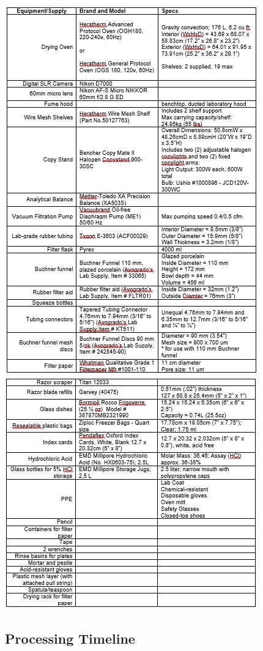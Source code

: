 \documentclass[
]{book}
\begin{document}
\includegraphics{images/CauEquipment1.jpg}
\includegraphics{images/CauEquipment2.jpg}

\hypertarget{processing-timeline}{%
\subsection{Processing Timeline}\label{processing-timeline}}
\end{document}
